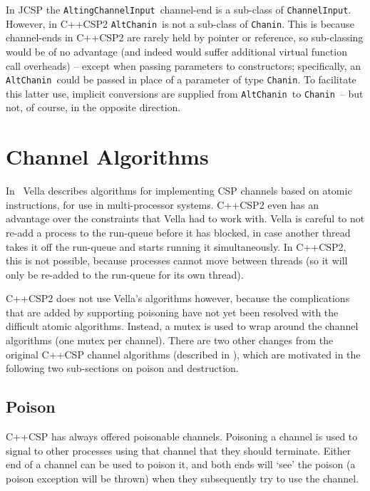 \documentclass[12pt]{IOS-Book-Article-CPA-2007}
\newcommand{\code}[1]{{\small\texttt{#1}}}
\begin{document}
In JCSP the \code{AltingChannelInput}~channel-end is a sub-class of \code{ChannelInput}.  However, in C++CSP2 \code{AltChanin}~is not a sub-class of 
\code{Chanin}.  This is because channel-ends in C++CSP2 are rarely held by pointer or reference, so sub-classing would be of no advantage (and 
indeed would suffer additional virtual function call overheads) -- except when passing parameters to constructors; specifically, an 
\code{AltChanin}~could be passed in place of a parameter of type \code{Chanin}.  To facilitate this latter use, implicit conversions are supplied from 
\code{AltChanin}~to \code{Chanin}~-- but not, of course, in the opposite direction.


\section{Channel Algorithms}

\label{sec-channel-alg}

In \cite{vella-phd-thesis}~Vella describes algorithms for implementing CSP channels based on atomic instructions, for use in multi-processor systems.  
C++CSP2 even has an advantage over the constraints that Vella had to work with.  Vella is careful to not re-add a process to the run-queue before it 
has blocked, in case another thread takes it off the run-queue and starts running it simultaneously.  In C++CSP2, this is not possible, because 
processes cannot move between threads (so it will only be re-added to the run-queue for its own thread).

C++CSP2 does not use Vella's algorithms however, because the complications that are added by supporting poisoning have not yet been resolved with the 
difficult atomic algorithms.  Instead, a mutex is used to wrap around the channel algorithms (one mutex per channel).  There are two other changes 
from the original C++CSP channel algorithms (described in \cite{brown-c++csp-03}), which are motivated in the following two sub-sections on poison and destruction.

\subsection{Poison}

C++CSP has always offered poisonable channels.  Poisoning a channel is used to signal to other processes using that channel that they should 
terminate.  Either end of a channel can be used to poison it, and both ends will `see' the poison (a poison exception will be thrown) when they 
subsequently try to use the channel.
\end{document}
